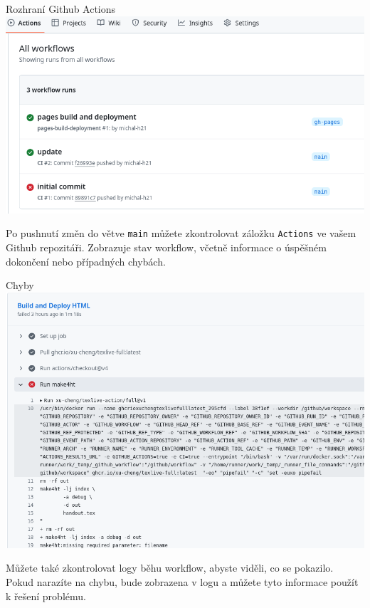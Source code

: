 
\begin{frame}[fragile]{Rozhraní Github Actions}
\includegraphics[width=\textwidth]{img/github-actions.png}
\end{frame}

Po pushnutí změn do větve \texttt{main} můžete zkontrolovat záložku
\texttt{Actions} ve vašem Github repozitáři. Zobrazuje stav workflow, včetně
informace o úspěšném dokončení nebo případných chybách.

\begin{frame}[fragile]{Chyby}
\includegraphics[width=\textwidth]{img/github-error.png}
\end{frame}

Můžete také zkontrolovat logy běhu workflow, abyste viděli, co se pokazilo.
Pokud narazíte na chybu, bude zobrazena v logu a můžete tyto informace
použít k řešení problému.

